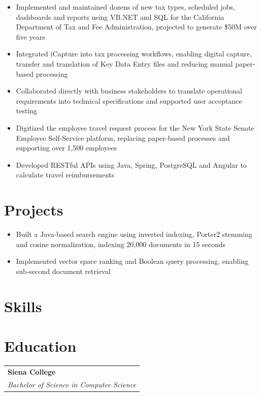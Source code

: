 \documentclass{hamzamemon}
\begin{document}
      \begin{itemize}
        \item Implemented and maintained dozens of new tax types, scheduled jobs, dashboards and reports using VB.NET and SQL for the California Department of Tax and Fee Administration, projected to generate \$50M over five years
        \item Integrated iCapture into tax processing workflows, enabling digital capture, transfer and translation of Key Data Entry files and reducing manual paper-based processing
        \item Collaborated directly with business stakeholders to translate operational requirements into technical specifications and supported user acceptance testing
      \end{itemize}

      \begin{itemize}
        \item Digitized the employee travel request process for the New York State Senate Employee Self-Service platform, replacing paper-based processes and supporting over 1,500 employees
        \item Developed RESTful APIs using Java, Spring, PostgreSQL and Angular to calculate travel reimbursements
      \end{itemize}
  
\section{Projects}
    \begin{itemize}
      \item Built a Java-based search engine using inverted indexing, Porter2 stemming and cosine normalization, indexing 20,000 documents in 15 seconds
      \item Implemented vector space ranking and Boolean query processing, enabling sub-second document retrieval
    \end{itemize}

\section{Skills}

\section{Education}
  \begin{tabularx}{\textwidth}{@{}X@{}}
    \textbf{Siena College} \\
    \textit{Bachelor of Science in Computer Science} \\
  \end{tabularx}

\end{document}

